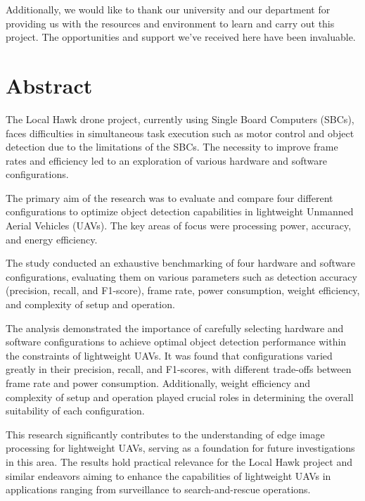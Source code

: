 \documentclass[
oneside    %
]{USN-BSc}
\begin{document}
Additionally, we would like to thank our university and our department for providing us with the resources and environment to learn and carry out this project. The opportunities and support we've received here have been invaluable.

\chapter{Abstract}
\label{sec:preface}



The Local Hawk drone project, currently using Single Board Computers (SBCs), faces difficulties in simultaneous task execution such as motor control and object detection due to the limitations of the SBCs. The necessity to improve frame rates and efficiency led to an exploration of various hardware and software configurations.

The primary aim of the research was to evaluate and compare four different configurations to optimize object detection capabilities in lightweight Unmanned Aerial Vehicles (UAVs). The key areas of focus were processing power, accuracy, and energy efficiency.

The study conducted an exhaustive benchmarking of four hardware and software configurations, evaluating them on various parameters such as detection accuracy (precision, recall, and F1-score), frame rate, power consumption, weight efficiency, and complexity of setup and operation.

The analysis demonstrated the importance of carefully selecting hardware and software configurations to achieve optimal object detection performance within the constraints of lightweight UAVs. It was found that configurations varied greatly in their precision, recall, and F1-scores, with different trade-offs between frame rate and power consumption. Additionally, weight efficiency and complexity of setup and operation played crucial roles in determining the overall suitability of each configuration.

This research significantly contributes to the understanding of edge image processing for lightweight UAVs, serving as a foundation for future investigations in this area. The results hold practical relevance for the Local Hawk project and similar endeavors aiming to enhance the capabilities of lightweight UAVs in applications ranging from surveillance to search-and-rescue operations.
\end{document}
